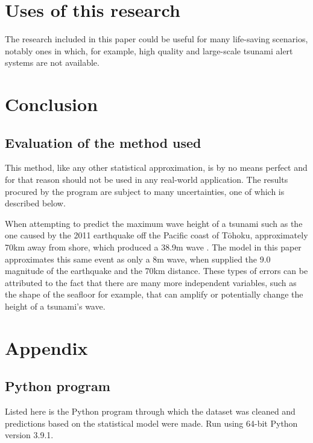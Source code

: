 \documentclass[11pt,letterpaper]{article}
\begin{document}
\section{Uses of this research}

The research included in this paper could be useful for many life-saving scenarios,
notably ones in which, for example, high quality and large-scale tsunami alert
systems are not available.

\section{Conclusion}

\subsection{Evaluation of the method used}

This method, like any other statistical approximation, is by no means perfect
and for that reason should not be used in any real-world application. The results
procured by the program are subject to many uncertainties, one of which is described
below.

When attempting to predict the maximum wave height of a tsunami such as the one
caused by the 2011 earthquake off the Pacific coast of Tōhoku, approximately 70km
away from shore, which produced a 38.9m wave \cite{yomiuri_2011}. The model in this
paper approximates this same event as only a 8m wave, when supplied the 9.0 magnitude
of the earthquake and the 70km distance. These types of errors can be attributed to the
fact that there are many more independent variables, such as the shape of the seafloor for
example, that can amplify or potentially change the height of a tsunami's wave.


\printbibliography[heading=bibintoc, title=Works Cited]

\appendix
\section{Appendix}
\label{app}
\subsection{Python program}
\label{app:scripts}

Listed here is the Python program through which the dataset was cleaned and
predictions based on the statistical model were made. Run using 64-bit Python
version 3.9.1.


\end{document}
